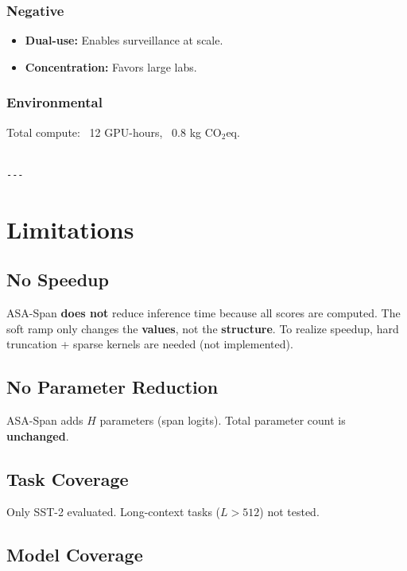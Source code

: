 \subsubsection{Negative}
\begin{itemize}
\item \textbf{Dual-use:} Enables surveillance at scale.
\item \textbf{Concentration:} Favors large labs.

\end{itemize}
\subsubsection{Environmental}
Total compute: ~12 GPU-hours, ~0.8 kg CO$_2$eq.
\begin{lstlisting}

---
\end{lstlisting}


\section{Limitations}

\subsection{No Speedup}

ASA-Span \textbf{does not} reduce inference time because all scores are computed. 
The soft ramp only changes the \textbf{values}, not the \textbf{structure}. To 
realize speedup, hard truncation + sparse kernels are needed (not implemented).

\subsection{No Parameter Reduction}

ASA-Span adds $H$ parameters (span logits). Total parameter count is 
\textbf{unchanged}.

\subsection{Task Coverage}

Only SST-2 evaluated. Long-context tasks ($L > 512$) not tested.

\subsection{Model Coverage}

